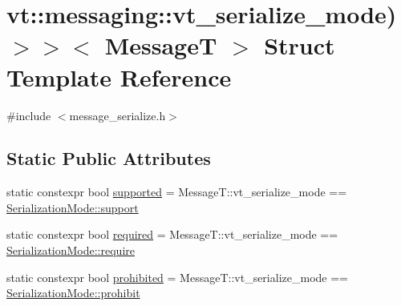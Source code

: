 \hypertarget{structvt_1_1messaging_1_1msg__serialization__mode_3_01_message_t_00_01cxx14__void__t_3_01decltyp859af933e7cec0c00885df897a55208a}{}\section{vt\+:\+:messaging\+:\+:vt\+\_\+serialize\+\_\+mode)$>$$>$$<$ MessageT $>$ Struct Template Reference}
\label{structvt_1_1messaging_1_1msg__serialization__mode_3_01_message_t_00_01cxx14__void__t_3_01decltyp859af933e7cec0c00885df897a55208a}


{\ttfamily \#include $<$message\+\_\+serialize.\+h$>$}

\subsection*{Static Public Attributes}
\begin{DoxyCompactItemize}
\item 
static constexpr bool \hyperlink{structvt_1_1messaging_1_1msg__serialization__mode_3_01_message_t_00_01cxx14__void__t_3_01decltyp859af933e7cec0c00885df897a55208a_a98da648b67d20fb70bc0fa10c605f3ce}{supported} = Message\+T\+::vt\+\_\+serialize\+\_\+mode == \hyperlink{namespacevt_1_1messaging_a436c5b9fc7f591e5978a136999cb9ef8a434990c8a25d2be94863561ae98bd682}{Serialization\+Mode\+::support}
\item 
static constexpr bool \hyperlink{structvt_1_1messaging_1_1msg__serialization__mode_3_01_message_t_00_01cxx14__void__t_3_01decltyp859af933e7cec0c00885df897a55208a_aa61ad4431413be76f64e45ddb00349bc}{required} = Message\+T\+::vt\+\_\+serialize\+\_\+mode == \hyperlink{namespacevt_1_1messaging_a436c5b9fc7f591e5978a136999cb9ef8af0ffd3b7c2574ac324603ed00488c850}{Serialization\+Mode\+::require}
\item 
static constexpr bool \hyperlink{structvt_1_1messaging_1_1msg__serialization__mode_3_01_message_t_00_01cxx14__void__t_3_01decltyp859af933e7cec0c00885df897a55208a_ae4c9b887be9f1bad94845328444a89eb}{prohibited} = Message\+T\+::vt\+\_\+serialize\+\_\+mode == \hyperlink{namespacevt_1_1messaging_a436c5b9fc7f591e5978a136999cb9ef8abc56ee21f7c9d61984fde885e8ce116f}{Serialization\+Mode\+::prohibit}
\end{DoxyCompactItemize}


